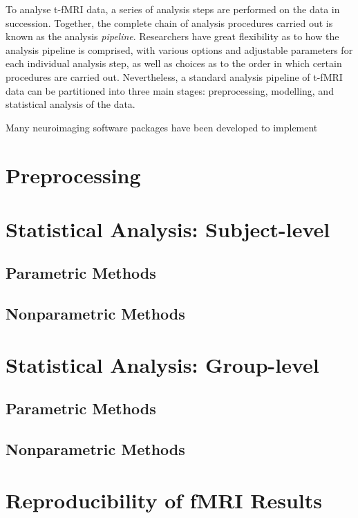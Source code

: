 To analyse t-fMRI data, a series of analysis steps are performed on the data in succession. Together, the complete chain of analysis procedures carried out is known as the analysis \textit{pipeline}. Researchers have great flexibility as to how the analysis pipeline is comprised, with various options and adjustable parameters for each individual analysis step, as well as choices as to the order in which certain procedures are carried out. Nevertheless, a standard analysis pipeline of t-fMRI data can be partitioned into three main stages: preprocessing, modelling, and statistical analysis of the data.  

 
Many neuroimaging software packages have been developed to implement   

\section{Preprocessing}

\section{Statistical Analysis: Subject-level}

\subsection{Parametric Methods}

\subsection{Nonparametric Methods}

\section{Statistical Analysis: Group-level}

\subsection{Parametric Methods}

\subsection{Nonparametric Methods}

\section{Reproducibility of fMRI Results}

